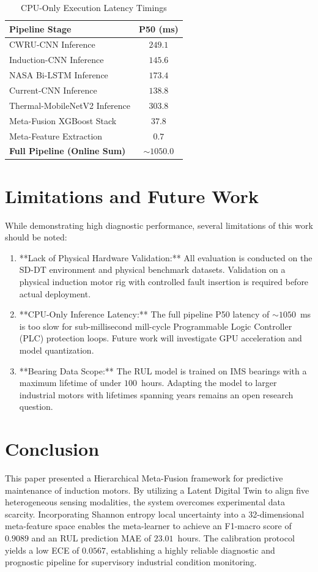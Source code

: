 \documentclass[journal]{IEEEtran}
\begin{document}
\begin{table}[h]
\renewcommand{\arraystretch}{1.2}
\caption{CPU-Only Execution Latency Timings}
\label{table_latency}
\centering
\begin{tabular}{lc}
\toprule
Pipeline Stage & P50 (ms) \\
\midrule
CWRU-CNN Inference & $249.1$ \\
Induction-CNN Inference & $145.6$ \\
NASA Bi-LSTM Inference & $173.4$ \\
Current-CNN Inference & $138.8$ \\
Thermal-MobileNetV2 Inference & $303.8$ \\
Meta-Fusion XGBoost Stack & $37.8$ \\
Meta-Feature Extraction & $0.7$ \\
\textbf{Full Pipeline (Online Sum)} & $\mathbf{\sim 1050.0}$ \\
\bottomrule
\end{tabular}
\end{table}

\section{Limitations and Future Work}
While demonstrating high diagnostic performance, several limitations of this work should be noted:
\begin{enumerate}
    \item **Lack of Physical Hardware Validation:** All evaluation is conducted on the SD-DT environment and physical benchmark datasets. Validation on a physical induction motor rig with controlled fault insertion is required before actual deployment.
    \item **CPU-Only Inference Latency:** The full pipeline P50 latency of $\sim 1050$~ms is too slow for sub-millisecond mill-cycle Programmable Logic Controller (PLC) protection loops. Future work will investigate GPU acceleration and model quantization.
    \item **Bearing Data Scope:** The RUL model is trained on IMS bearings with a maximum lifetime of under $100$~hours. Adapting the model to larger industrial motors with lifetimes spanning years remains an open research question.
\end{enumerate}

\section{Conclusion}
This paper presented a Hierarchical Meta-Fusion framework for predictive maintenance of induction motors. By utilizing a Latent Digital Twin to align five heterogeneous sensing modalities, the system overcomes experimental data scarcity. Incorporating Shannon entropy local uncertainty into a 32-dimensional meta-feature space enables the meta-learner to achieve an F1-macro score of $0.9089$ and an RUL prediction MAE of $23.01$~hours. The calibration protocol yields a low ECE of $0.0567$, establishing a highly reliable diagnostic and prognostic pipeline for supervisory industrial condition monitoring.



\end{document}
